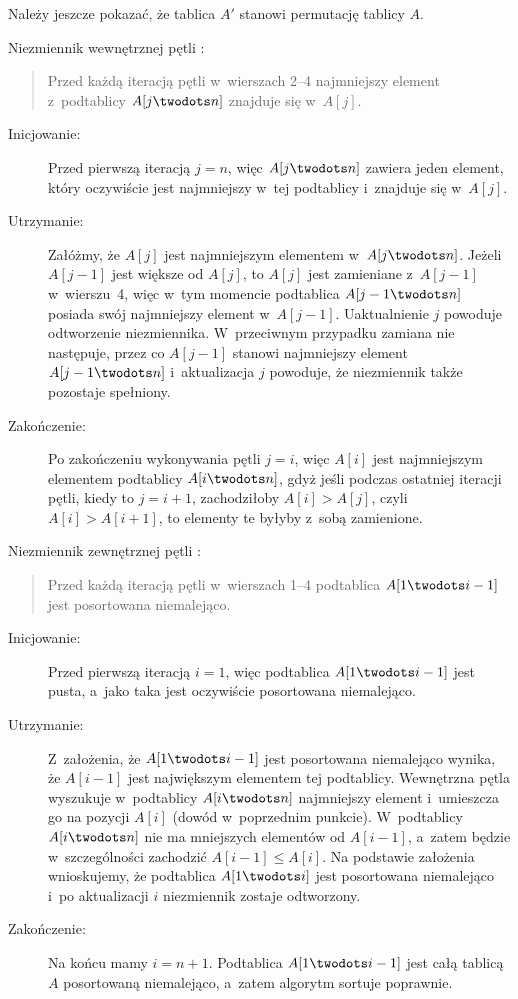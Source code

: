
\subexercise{} %
Należy jeszcze pokazać, że tablica $A'$ stanowi permutację tablicy $A$.

\subexercise{} %
Niezmiennik wewnętrznej pętli :
\begin{quote}
Przed każdą iteracją pętli  w~wierszach 2\nobreakdash--4 najmniejszy element z~podtablicy $A[j\twodots n]$ znajduje się w~$A[j]$.
\end{quote}
\begin{description}
	\item[Inicjowanie:] Przed pierwszą iteracją $j=n$, więc $A[j\twodots n]$ zawiera jeden element, który oczywiście jest najmniejszy w~tej podtablicy i~znajduje się w~$A[j]$.
	\item[Utrzymanie:] Załóżmy, że $A[j]$ jest najmniejszym elementem w~$A[j\twodots n]$. Jeżeli $A[j-1]$ jest większe od $A[j]$, to $A[j]$ jest zamieniane z~$A[j-1]$ w~wierszu~4, więc w~tym momencie podtablica $A[j-1\twodots n]$ posiada swój najmniejszy element w~$A[j-1]$. Uaktualnienie $j$ powoduje odtworzenie niezmiennika. W~przeciwnym przypadku zamiana nie następuje, przez co $A[j-1]$ stanowi najmniejszy element $A[j-1\twodots n]$ i~aktualizacja $j$ powoduje, że niezmiennik także pozostaje spełniony.
	\item[Zakończenie:] Po zakończeniu wykonywania pętli $j=i$, więc $A[i]$ jest najmniejszym elementem podtablicy $A[i\twodots n]$, gdyż jeśli podczas ostatniej iteracji pętli, kiedy to $j=i+1$, zachodziłoby $A[i]>A[j]$, czyli $A[i]>A[i+1]$, to elementy te byłyby z~sobą zamienione.
\end{description}

\subexercise{} %
Niezmiennik zewnętrznej pętli :
\begin{quote}
Przed każdą iteracją pętli  w~wierszach 1\nobreakdash--4 podtablica $A[1\twodots i-1]$ jest posortowana niemalejąco.
\end{quote}
\begin{description}
	\item[Inicjowanie:] Przed pierwszą iteracją $i=1$, więc podtablica $A[1\twodots i-1]$ jest pusta, a~jako taka jest oczywiście posortowana niemalejąco.
	\item[Utrzymanie:] Z~założenia, że $A[1\twodots i-1]$ jest posortowana niemalejąco wynika, że $A[i-1]$ jest największym elementem tej podtablicy. Wewnętrzna pętla  wyszukuje w~podtablicy $A[i\twodots n]$ najmniejszy element i~umieszcza go na pozycji $A[i]$ (dowód w~poprzednim punkcie). W~podtablicy $A[i\twodots n]$ nie ma mniejszych elementów od $A[i-1]$, a~zatem będzie w~szczególności zachodzić $A[i-1]\le A[i]$. Na podstawie założenia wnioskujemy, że podtablica $A[1\twodots i]$ jest posortowana niemalejąco i~po aktualizacji $i$ niezmiennik zostaje odtworzony.
	\item[Zakończenie:] Na końcu mamy $i=n+1$. Podtablica $A[1\twodots i-1]$ jest całą tablicą $A$ posortowaną niemalejąco, a~zatem algorytm sortuje poprawnie.
\end{description}


